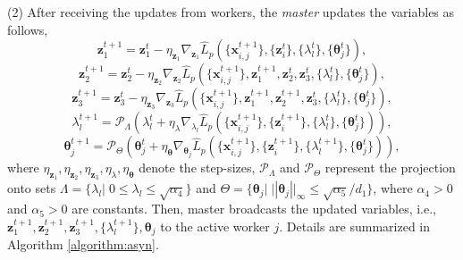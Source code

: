 \documentclass[letterpaper]{article} %
\begin{document}
\noindent (2) After receiving the updates from workers, the \emph{master} updates the variables as follows,
\begin{equation}
\label{eq:update_z1_asyn}
\!{\boldsymbol{z}_1^{t+1}} \!=\! {\boldsymbol{z}_1^{t}}\!-\!\eta_{\boldsymbol{z}_1}\! \nabla_{\boldsymbol{z}_1}\widehat{L}_p(\{{\boldsymbol{x}_{i,j}^{t+1}}\} ,\!\{{\boldsymbol{z}_i^t} \},\! \{\lambda_l^t\},\! \{\boldsymbol{\theta}_j^t\} ),
\end{equation}
\begin{equation}
\label{eq:update_z2_asyn}
{\boldsymbol{z}_2^{t+1}} \!=\! {\boldsymbol{z}_2^{t}} \!-\!\eta_{\boldsymbol{z}_2}\! \nabla_{\boldsymbol{z}_2}\widehat{L}_p(\{{\boldsymbol{x}_{i,j}^{t+1}}\} ,\!{\boldsymbol{z}_1^{t+1}}\!,{\boldsymbol{z}_2^t},{\boldsymbol{z}_3^t},\! \{\lambda_l^t\},\! \{\boldsymbol{\theta}_j^t\} ),
\end{equation}
\begin{equation}
\label{eq:update_z3_asyn}
{\boldsymbol{z}_3^{t+1}} \!=\! {\boldsymbol{z}_3^{t}}\!-\!\eta_{\boldsymbol{z}_3} \! \nabla_{\boldsymbol{z}_3}\widehat{L}_p(\{{\boldsymbol{x}_{i,j}^{t+1}}\} ,\!{\boldsymbol{z}_1^{t+1}}\!,{\boldsymbol{z}_2^{t+1}}\!,{\boldsymbol{z}_3^t},\! \{\lambda_l^t\},\! \{\boldsymbol{\theta}_j^t\} ),
\end{equation}
\begin{equation}
\label{eq:update_lambda_asyn}
\!{\lambda_l^{t+1}} \!=\! \mathcal{P}_{\Lambda} ( {\lambda_l^{t}}\!+\!\eta_{\lambda}\! \nabla_{\lambda_l}\widehat{L}_p(\{{\boldsymbol{x}_{i,j}^{t+1}}\} ,\!\{{\boldsymbol{z}_i^{t+1}}\},\! \{\lambda_l^t\},\! \{\boldsymbol{\theta}_j^t\} ) ),
\end{equation}
\begin{equation}
\label{eq:update_theta_asyn}
\!{\boldsymbol{\theta}_j^{t+1}} \!=\! \mathcal{P}_{\Theta}({\boldsymbol{\theta}_j^{t}}\!+\!\eta_{\boldsymbol{\theta}}\! \nabla_{\boldsymbol{\theta}_j}\widehat{L}_p(\{{\boldsymbol{x}_{i,j}^{t+1}}\} ,\!\{{\boldsymbol{z}_i^{t+1}}\}, \!\{\lambda_l^{t+1}\}, \!\{\boldsymbol{\theta}_j^t\} )),
\end{equation}
where $\eta_{\boldsymbol{z}_1}, \eta_{\boldsymbol{z}_2}, \eta_{\boldsymbol{z}_3}, \eta_{\lambda}, \eta_{\boldsymbol{\theta}}$ denote the step-sizes, $\mathcal{P}_{\Lambda}$ and $\mathcal{P}_{\Theta}$ represent the projection onto sets ${\Lambda}=\{ \lambda_l|\; 0 \! \le \! \lambda_l \! \le \! \sqrt{\alpha_4}  \}$ and ${\Theta}=\{ \boldsymbol{\theta}_j|\; ||\boldsymbol{\theta}_j||_{\infty}\! \le \! \sqrt{\alpha_5}/d_1 \}$, where $\alpha_4 \!>\!0$ and $\alpha_5 \!>\!0$ are constants. Then, master broadcasts the updated variables, i.e., ${\boldsymbol{z}_1^{t+1}}, {\boldsymbol{z}_2^{t+1}}, {\boldsymbol{z}_3^{t+1}}, \{\lambda_l^{t+1}\}, \boldsymbol{\theta}_j$ to the active worker $j$. Details are summarized in Algorithm \ref{algorithm:asyn}.
\end{document}
